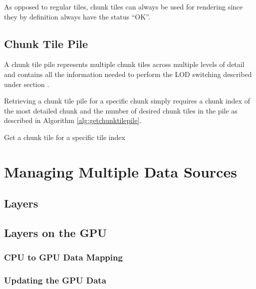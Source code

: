 As opposed to regular tiles, chunk tiles can always be used for rendering since they by definition always have the status ``OK''.

\subsection{Chunk Tile Pile}

A chunk tile pile represents multiple chunk tiles across multiple levels of detail and contains all the information needed to perform the LOD switching described under section .

Retrieving a chunk tile pile for a specific chunk simply requires a chunk index of the most detailed chunk and the number of desired chunk tiles in the pile as described in Algorithm \ref{alg:getchunktilepile}.

\begin{algorithm}[htp]
 \caption{Get a chunk tile for a specific tile index}
  \label{alg:getchunktilepile}
\end{algorithm}


\section{Managing Multiple Data Sources}

\subsection{Layers}

\subsection{Layers on the GPU}

\subsubsection{CPU to GPU Data Mapping}

\subsubsection{Updating the GPU Data}


